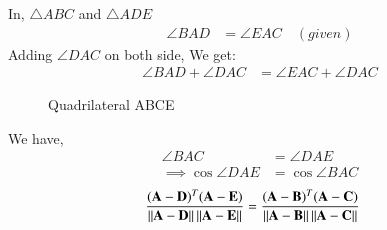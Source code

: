 In, $\triangle{ABC}$ and $\triangle{ADE}$
\begin{align} 
\angle BAD &= \angle EAC \quad (given) \label{eq:solutions/1/26/eq1}
\end{align}
Adding $\angle DAC$ on both side, We get:
\begin{align}
 \angle BAD + \angle DAC &= \angle EAC + \angle DAC \label{eq:solutions/1/26/eqn_2} 
\end{align}

\begin{figure}[!htb]
	\centering
    \centering
\resizebox{\columnwidth}{!}{}
	\caption{Quadrilateral ABCE}
\end{figure}
We have,
\begin{align}
 \angle BAC &= \angle DAE \label{eq:solutions/1/26/eq3}\\
 \implies \cos\angle DAE  &=  \cos\angle BAC \label{eq:solutions/1/26/eq4}
\end{align}
\begin{align}
 \frac{(\mathbf A -\mathbf D)^T(\mathbf{A}-\mathbf{E})} {\left\lVert\mathbf{A}-\mathbf{D}\right\rVert \left\lVert\mathbf{A}-\mathbf{E}\right\rVert } 
 &= \frac{(\mathbf A -\mathbf B)^T(\mathbf{A}-\mathbf{C})} {\left\lVert\mathbf{A}-\mathbf{B}\right\rVert \left\lVert\mathbf{A}-\mathbf{C}\right\rVert}\label{eq:solutions/1/26/eq7}
 \end{align}

